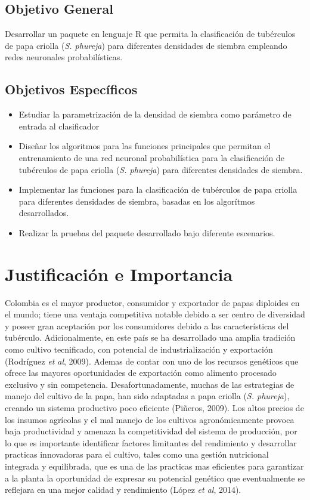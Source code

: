 \subsection{Objetivo General}

Desarrollar un paquete en lenguaje R que permita la clasificación de tubérculos de papa criolla (\textit{S. phureja}) para diferentes densidades de siembra empleando redes neuronales probabilísticas.

\subsection{Objetivos Espec\'ificos}
 
\begin{itemize}
\item{Estudiar la parametrizaci\'on de la densidad de siembra como par\'ametro de entrada al clasificador}
\item{Diseñar los algoritmos para las funciones principales que permitan el entrenamiento de una red neuronal probabilística para la clasificación de tubérculos de papa criolla (\textit{S. phureja}) para diferentes densidades de siembra.}
\item{Implementar las funciones  para la clasificación de tubérculos de papa criolla para diferentes densidades de siembra, basadas en los algorítmos desarrollados.}
\item{Realizar la pruebas del paquete desarrollado bajo diferente escenarios.}
\end{itemize}

\section{Justificación e Importancia}

Colombia es el mayor productor, consumidor y exportador de papas diploides en el mundo; tiene una ventaja competitiva notable debido a ser centro de diversidad y poseer gran aceptación por los consumidores debido a las características del tubérculo. Adicionalmente, en este país se ha desarrollado una amplia tradición como cultivo tecnificado, con potencial de industrialización y exportación (Rodríguez \textit{et al}, 2009). Ademas de contar con uno de los recursos genéticos que ofrece las mayores oportunidades de exportación como alimento procesado exclusivo y sin competencia. Desafortunadamente, muchas de las estrategias de manejo del cultivo de la papa, han sido adaptadas a papa criolla (\textit{S. phureja}), creando un sistema productivo poco eficiente (Piñeros, 2009). Los altos precios de los insumos agrícolas y el mal manejo de los cultivos agronómicamente provoca  baja productividad y amenaza la competitividad del sistema de producción, por lo que es importante identificar factores limitantes del rendimiento y desarrollar practicas innovadoras para el cultivo, tales como una gestión nutricional integrada y equilibrada, que es una de las practicas mas eficientes para garantizar a la planta la oportunidad de expresar su potencial genético que eventualmente se reflejara en una mejor calidad y rendimiento (López \textit{et al}, 2014).\\
 
